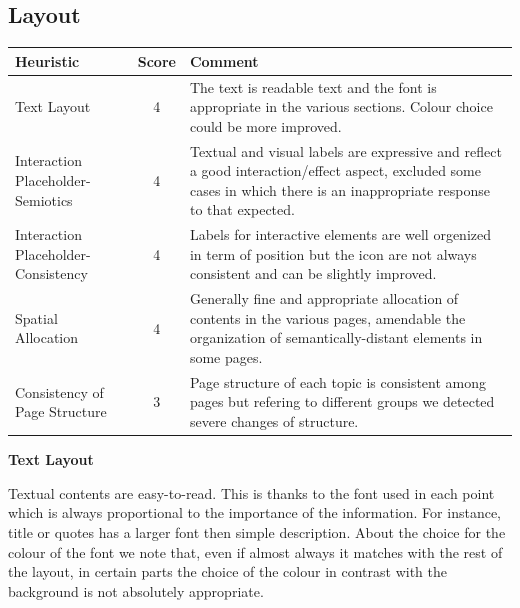 \pagebreak
\subsection{Layout}
\label{Layout}

\begin{table}[H]
  \begin{center}
    \label{tab:table1}
    \begin{tabular}{||l|c|p{8cm}||} %
      \textbf{Heuristic} & \textbf{Score} & \textbf{Comment}\\
      
      \hline
      Text Layout & 4 & The text is readable text and the font is appropriate in the various sections. Colour choice could be more improved.\\
      \hline
      Interaction Placeholder-Semiotics & 4 & Textual and visual labels are expressive and reflect a good interaction/effect aspect, excluded some cases in which there is an inappropriate response to that expected.\\
      \hline
      Interaction Placeholder-Consistency & 4 & Labels for interactive elements are well orgenized in term of position but the icon are not always consistent and can be slightly improved.\\
      \hline
      Spatial Allocation & 4 & Generally fine and appropriate allocation of contents in the various pages, amendable the organization of semantically-distant elements in some pages.\\
      \hline
      Consistency of Page Structure & 3 & Page structure of each topic is consistent among pages but refering to different groups we detected severe changes of structure.\\

    \end{tabular}
  \end{center}
\end{table}
\medskip

\textbf{Text Layout}\par
Textual contents are easy-to-read. This is thanks to the font used in each point which is always proportional to the importance of the information. For instance, title or quotes has a larger font then simple description. About the choice for the colour of the font we note that, even if almost always it matches with the rest of the layout, in certain parts the choice of the colour in contrast with the background is not absolutely appropriate.
\medskip


